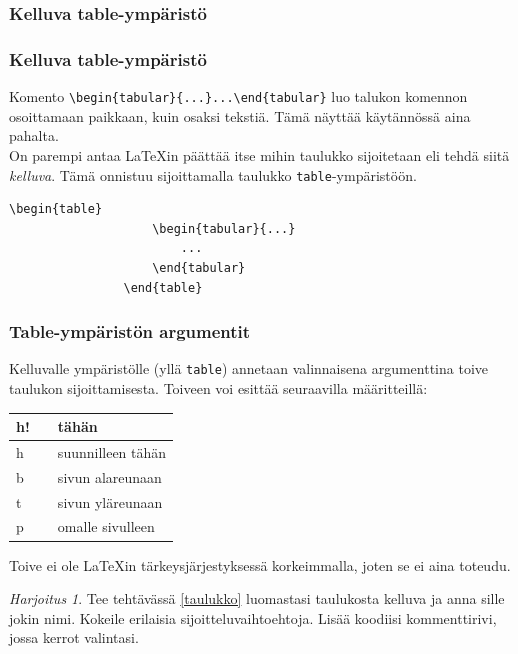 \documentclass[handout,hyperref={colorlinks=true}]{beamer}
\theoremstyle{remark}
\newtheorem{harj}{Harjoitus}[section]
\newcommand{\vaihto}{\\ \vspace{10pt}}
\begin{document}
\subsubsection{Kelluva table-ympäristö}
\begin{frame}[fragile]
    \frametitle{Kelluva table-ympäristö}
Komento \verb-\begin{tabular}{...}...\end{tabular}- luo talukon komennon osoittamaan paikkaan, kuin osaksi tekstiä. Tämä näyttää käytännössä aina pahalta. 
    \vaihto
    On parempi antaa \LaTeX in päättää itse mihin taulukko sijoitetaan eli tehdä siitä \emph{kelluva}. Tämä onnistuu sijoittamalla taulukko \verb-table--ympäristöön.
    \begin{table}
        \begin{scriptsize}
            \begin{Verbatim}[frame=single]
                \begin{table}
                    \begin{tabular}{...}
                        ...
                    \end{tabular}
                \end{table}
            \end{Verbatim}
        \end{scriptsize} 
    \end{table}
\end{frame}
\begin{frame}[fragile]
    \frametitle{Table-ympäristön argumentit}
    Kelluvalle ympäristölle (yllä \verb-table-) annetaan valinnaisena argumenttina toive taulukon sijoittamisesta. Toiveen voi esittää seuraavilla määritteillä:
    \begin{table}
        \begin{tabular}{lcl}

            h! && tähän\\
            \hline
            h && suunnilleen tähän\\
            \hline
            b && sivun alareunaan\\
            \hline
            t && sivun yläreunaan\\
            \hline
            p && omalle sivulleen\\

        \end{tabular}
    \end{table}
    Toive ei ole \LaTeX in tärkeysjärjestyksessä korkeimmalla, joten se ei aina toteudu.
\end{frame}
\begin{frame}[fragile]
    \begin{harj}\label{kelluvaTaulukko}
        Tee tehtävässä \ref{taulukko} luomastasi taulukosta kelluva ja anna sille jokin nimi. Kokeile erilaisia sijoitteluvaihtoehtoja. Lisää koodiisi kommenttirivi, jossa kerrot valintasi. 
    \end{harj}

\end{frame}
\end{document}
